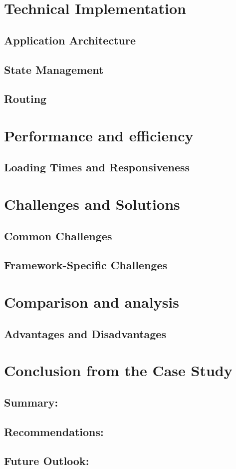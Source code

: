 \section{Technical Implementation}
\subsection{Application Architecture}
\subsection{State Management}
\subsection{Routing}

\section{Performance and efficiency}
\subsection{Loading Times and Responsiveness}

\section{Challenges and Solutions}
\subsection{Common Challenges}
\subsection{Framework-Specific Challenges}

\section{Comparison and analysis}
\subsection{Advantages and Disadvantages}

\section{Conclusion from the Case Study}
\subsection{Summary: }
\subsection{Recommendations: }
\subsection{Future Outlook: }